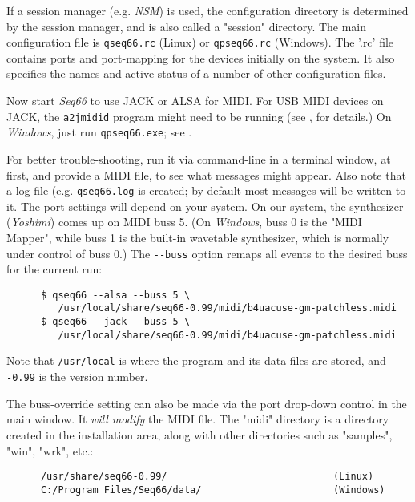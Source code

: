    If a session manager (e.g. \textsl{NSM})
   is used, the configuration directory is determined by
   the session manager, and is also called a "session" directory.
   The main configuration file is
   \texttt{qseq66.rc} (Linux) or
   \texttt{qpseq66.rc} (Windows).
   The '.rc' file contains ports and port-mapping for the devices
   initially on the system.
   It also specifies the names and active-status
   of a number of other configuration files.

   Now start \textsl{Seq66} to use JACK or ALSA for MIDI.
   For USB MIDI devices on JACK, the \texttt{a2jmidid} program might
   need to be running
   (see , for details.)
   On \textsl{Windows}, just run \texttt{qpseq66.exe};
   see .

   For better trouble-shooting, run it via command-line in
   a terminal window, at first, and provide a MIDI file, to
   see what messages might appear.
   Also note that a log file (e.g. \texttt{qseq66.log} is created;
   by default most messages will be written to it.
   The port settings will depend on your system.
   On our system, the synthesizer (\textsl{Yoshimi}) comes up on MIDI buss 5.
   (On \textsl{Windows}, buss 0 is the "MIDI Mapper", while buss 1 is the
   built-in wavetable synthesizer, which is normally under control of buss 0.)
   The \texttt{-{}-buss} option remaps all events to the desired buss for
   the current run:

   \begin{verbatim}
      $ qseq66 --alsa --buss 5 \
         /usr/local/share/seq66-0.99/midi/b4uacuse-gm-patchless.midi
      $ qseq66 --jack --buss 5 \
         /usr/local/share/seq66-0.99/midi/b4uacuse-gm-patchless.midi
   \end{verbatim}

   Note that \texttt{/usr/local} is where the program and its data files
   are stored, and \texttt{-0.99} is the version number.

   The buss-override setting can also be made via the port drop-down control
   in the main window.
   It \textsl{will modify} the MIDI file.
   The "midi" directory is a directory created in the installation area,
   along with other directories such as "samples", "win", "wrk", etc.:

   \begin{verbatim}
      /usr/share/seq66-0.99/                             (Linux)
      C:/Program Files/Seq66/data/                       (Windows)
   \end{verbatim}

